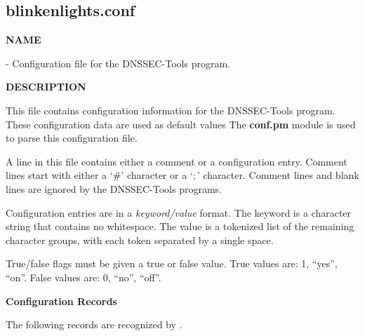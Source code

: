 \clearpage

\subsection{\bf blinkenlights.conf}

{\bf NAME}

 - Configuration file for the DNSSEC-Tools
 program.

{\bf DESCRIPTION}

This file contains configuration information for the DNSSEC-Tools
 program.  These configuration data are used as default
values The {\bf conf.pm} module is used to parse this configuration file.

A line in this file contains either a comment or a configuration
entry.  Comment lines start with either a `\#' character or a `$;$' character.
Comment lines and blank lines are ignored by the DNSSEC-Tools programs.

Configuration entries are in a {\it keyword/value} format.  The keyword is a
character string that contains no whitespace.  The value is a tokenized list
of the remaining character groups, with each token separated by a single space.

True/false flags must be given a true or false value.
True values are:  1, ``yes'', ``on''.
False values are:  0, ``no'', ``off''.

{\bf Configuration Records}

The following records are recognized by .


